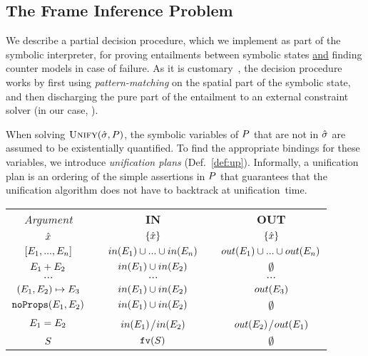 \subsection{The Frame Inference Problem}\label{subsec:fip}

We describe a partial decision procedure, which we  
implement as part of the \jsil symbolic interpreter, for proving entailments 
between symbolic states \underline{and} finding counter 
models in case of failure.  
As it is customary~\cite{javert,jacobs2011verifast,sepwithsmt}, the decision procedure works by first using \emph{pattern-matching} 
on the spatial part of the symbolic state, and then discharging the pure part of the 
entailment to an external constraint solver (in our case, \rosette). 

When solving $\textsc{Unify}(\hat{\sigma}, P)$, the symbolic variables of $P$ that are not 
in $\hat{\sigma}$ are assumed to be existentially quantified. 
To find the appropriate bindings for these variables, we 
introduce \emph{unification plans} (Def.~\ref{def:up}).
Informally, a unification plan is an ordering of the simple assertions in $P$ that 
guarantees that the unification algorithm does not have to backtrack at unification~time. 

\begin{table}[!h]
{\small \begin{tabular}{@{}c@{}ccc@{}c@{}}\toprule
\emph{Argument} & & \textbf{IN}  & & \textbf{OUT}  \\
\cmidrule{1-1} \cmidrule{3-3} \cmidrule{5-5}

$\hat{x}$                                                       & & $\{ \hat{x} \}$                                                          & & $\{ \hat{x} \}$    \\
$[ E_1, ..., E_n ]$                     & & $in(E_1) \cup ... \cup in(E_n)$      & & $out(E_1) \cup ... \cup out(E_n)$ \\
$E_1 + E_2$                                    & & $in(E_1) \cup in(E_2)$                  & & $\emptyset$ \\
$\cdots$ & & $\cdots$ & & $\cdots$ \\[1pt]
$(E_1, E_2)\mapsto E_3$   & & $in(E_1) \cup in(E_2)$ & & $out(E_3)$  \\
%
$\texttt{noProps}(E_1, E_2)$           &  & $in(E_1) \cup in(E_2)$ & & $\emptyset$ \\
%
$E_1 = E_2$                               & & $in(E_1)$/$in(E_2)$      & & $out(E_2)$/$out(E_1)$ \\
%
$S$                                                    & & $\texttt{fv}(S)$                                           & & $\emptyset$ \\
\bottomrule
\end{tabular}}
\end{table}

